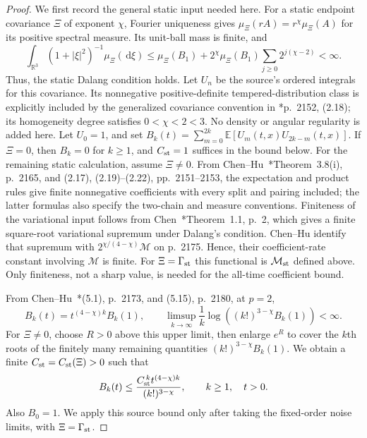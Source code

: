 \documentclass[12pt]{article}
\numberwithin{equation}{section}
\theoremstyle{definition}
\newcommand{\R}{\mathbb{R}}
\newcommand{\E}{\mathbb{E}}
\newcommand{\ud}{\,\mathrm{d}}
\begin{document}
\begin{proof}
  We first record the general static input needed here. For a static
  endpoint covariance $\Xi$ of exponent $\chi$, Fourier uniqueness
  gives $\mu_\Xi(rA)=r^\chi\mu_\Xi(A)$ for its positive spectral
  measure. Its unit-ball mass is finite, and
  \[
    \int_{\R^3}(1+|\xi|^2)^{-1}\mu_\Xi(\ud\xi)
    \le\mu_\Xi(B_1)
    +2^\chi\mu_\Xi(B_1)\sum_{j\ge0}2^{j(\chi-2)}<\infty.
  \]
  Thus, the static Dalang condition holds. Let $U_n$ be the source's
  ordered integrals for this covariance. Its nonnegative positive-definite
  tempered-distribution class is explicitly included by the generalized
  covariance convention in
  \cite{chen.hu:25:hyperbolic}*{p.~2152, (2.18)}; its homogeneity degree
  satisfies $0<\chi<2<3$. No density or angular regularity is added here.
  Let $U_0=1$, and set
  $B_k(t)=\sum_{m=0}^{2k}\E[U_m(t,x)U_{2k-m}(t,x)]$.
  If $\Xi=0$, then $B_k=0$ for $k\ge1$, and $C_{\rm st}=1$
  suffices in the bound below. For the remaining static calculation,
  assume $\Xi\ne0$. From Chen--Hu~\cite{chen.hu:25:hyperbolic}*{Theorem~3.8(i), p.~2165,
  and (2.17), (2.19)--(2.22), pp.~2151--2153}, the expectation and
  product rules give finite nonnegative coefficients with every split
  and pairing included; the latter formulas also specify the two-chain
  and measure conventions. Finiteness of
  the variational input follows from
  Chen~\cite{chen:23:exponential}*{Theorem~1.1, p.~2}, which gives a
  finite square-root variational supremum under Dalang's condition.
  Chen--Hu identify that supremum with
  $2^{\chi/(4-\chi)}\mathcal{M}$ on p.~2175. Hence, their
  coefficient-rate constant involving $\mathcal{M}$ is finite.
  For $\Xi=\Gamma_{\rm st}$ this functional is $\mathcal{M}_{\rm st}$
  defined above. Only finiteness, not a sharp value, is needed for the
  all-time coefficient bound.

  From Chen--Hu~\cite{chen.hu:25:hyperbolic}*{(5.1), p.~2173,
  and (5.15), p.~2180}, at $p=2$,
  \[
    B_k(t)=t^{(4-\chi)k}B_k(1),\qquad
    \limsup_{k\to\infty}\frac1k
    \log\left((k!)^{3-\chi}B_k(1)\right)<\infty.
  \]
  For $\Xi\ne0$, choose $R>0$ above this upper limit, then enlarge
  $e^R$ to cover the $k$th roots of the finitely many remaining
  quantities $(k!)^{3-\chi}B_k(1)$. We obtain a finite
  $C_{\rm st}=C_{\rm st}(\Xi)>0$ such that
  \begin{equation}\label{E:three-static-coefficient}
    B_k(t)\le\frac{C_{\rm st}^{\,k}t^{(4-\chi)k}}{(k!)^{3-\chi}},
    \qquad k\ge1,\quad t>0.
  \end{equation}
  Also $B_0=1$. We apply this source bound only after taking the
  fixed-order noise limits, with $\Xi=\Gamma_{\rm st}$.


\end{proof}
\end{document}
